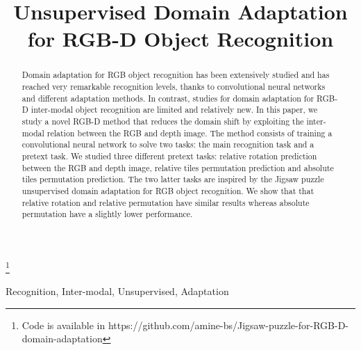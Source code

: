 \documentclass[conference]{IEEEtran}
\begin{document}
\title{Unsupervised Domain Adaptation for RGB-D Object Recognition\\
}
\thanks{Code is available in https://github.com/amine-bs/Jigsaw-puzzle-for-RGB-D-domain-adaptation}

\author{
\and
{}
}

\maketitle

\begin{abstract}
Domain adaptation for RGB object recognition has been extensively studied and has reached very remarkable recognition levels, thanks to convolutional neural networks and different adaptation methods. In contrast, studies for domain adaptation for RGB-D inter-modal object recognition are limited and relatively new. In this paper, we study a novel RGB-D method that reduces the domain shift by exploiting the inter-modal relation between the RGB and depth image. The method consists of training a convolutional neural network to solve two tasks: the main recognition task and a pretext task.
We studied three different pretext tasks: relative rotation prediction between the RGB and depth image, relative tiles permutation prediction and absolute tiles permutation prediction. The two latter tasks are inspired by the Jigsaw puzzle unsupervised domain adaptation for RGB object recognition. We show that that relative rotation and relative permutation have similar results whereas absolute permutation have a slightly lower performance.
\\
\end{abstract}

\begin{IEEEkeywords}
Recognition, Inter-modal, Unsupervised, Adaptation
\end{IEEEkeywords}
\end{document}
